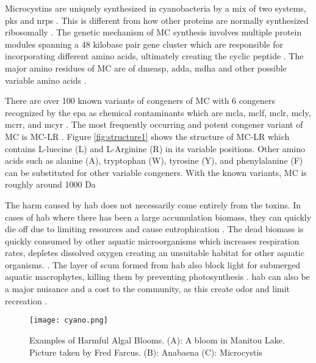 Microcystins are uniquely synthesized in cyanobacteria by a mix of two systems, \gls{pks} and  \gls{nrps} \cite{tillett_structural_2000}. This is different from how other proteins are normally synthesized ribosomally . The genetic mechanism of MC synthesis involves multiple protein modules spanning a 48 kilobase pair gene cluster which are responsible for incorporating different amino acids, ultimately creating the cyclic peptide \cite{moffitt_characterization_2004,nishizawa_genetic_1999}. The major amino residues of MC  are of \gls{dmeasp}, \gls{adda},  \gls{mdha} and other possible variable amino acids \cite{trogen_conformational_1996,nishizawa_genetic_1999}.

There are over 100 known variants of congeners of MC with 6 congeners recognized by the \gls{epa} as chemical contaminants which are \gls{mcla}, \gls{mclf}, \gls{mclr}, \gls{mcly}, \gls{mcrr}, and \gls{mcyr} \cite{puddick_modulation_2016}. The most frequently occurring and potent congener variant of MC is MC-LR \cite{rastogi_cyanotoxin-microcystins:_2014}. Figure \ref{fig:structure1} shows the structure of MC-LR which contains L-luecine (L) and L-Arginine (R) in its variable positions. Other amino acids such as alanine (A), tryptophan (W), tyrosine (Y), and phenylalanine (F) can be substituted for other variable congeners. With the known variants, MC is roughly around 1000 Da \cite{dittmann_cyanobacterial_2012}

The harm caused by \gls{hab} does not necessarily come entirely from the toxins. In cases of \gls{hab} where there has been a large accumulation biomass, they can quickly die off due to limiting resources and cause eutrophication \cite{charlton_oxygen_1980}. The dead biomass is quickly consumed by other aquatic microorganisms which increases respiration rates, depletes dissolved oxygen creating an unsuitable habitat for other aquatic organisms.  \cite{anderson_harmful_2002}. The layer of scum formed from \gls{hab} also block light for submerged aquatic macrophytes, killing them by preventing photosynthesis \cite{ bucak_modeling_2018}. \gls{hab} can also be a major nuisance and a cost to the community, as this create odor and limit recreation \cite{graham_cyanotoxin_2010, carmichael_health_2016}.


\begin{figure}[!h]
	\texttt{[image: cyano.png]}
	\caption{
		Examples of Harmful Algal Blooms. (A): A bloom in Manitou Lake. Picture taken by Fred Farcus. (B): Anabaena (C): Microcystis
	}
	\label{fig:cyano}
\end{figure}


